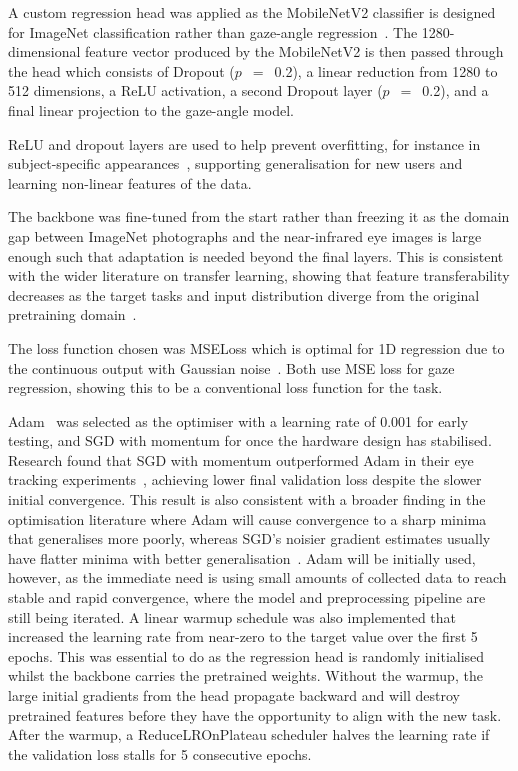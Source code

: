 A custom regression head was applied as the MobileNetV2 classifier is designed for ImageNet classification rather than gaze-angle regression~\cite{sandler2018mobilenetv2}. The 1280-dimensional feature vector produced by the MobileNetV2 is then passed through the head which consists of Dropout ($p$~$=$~0.2), a linear reduction from 1280 to 512 dimensions, a ReLU activation, a second Dropout layer ($p$~$=$~0.2), and a final linear projection to the gaze-angle model.

ReLU and dropout layers are used to help prevent overfitting, for instance in subject-specific appearances~\cite{srivastava2014dropout}, supporting generalisation for new users and learning non-linear features of the data.

The backbone was fine-tuned from the start rather than freezing it as the domain gap between ImageNet photographs and the near-infrared eye images is large enough such that adaptation is needed beyond the final layers. This is consistent with the wider literature on transfer learning, showing that feature transferability decreases as the target tasks and input distribution diverge from the original pretraining domain~\cite{yosinski2014transferable}.

The loss function chosen was MSELoss which is optimal for 1D regression due to the continuous output with Gaussian noise~\cite{zhang2015appearance, krafka2016eye}. Both use MSE loss for gaze regression, showing this to be a conventional loss function for the task.

Adam~\cite{kingma2015adam} was selected as the optimiser with a learning rate of 0.001 for early testing, and SGD with momentum for once the hardware design has stabilised. Research found that SGD with momentum outperformed Adam in their eye tracking experiments~\cite{chugh2020eye}, achieving lower final validation loss despite the slower initial convergence. This result is also consistent with a broader finding in the optimisation literature where Adam will cause convergence to a sharp minima that generalises more poorly, whereas SGD's noisier gradient estimates usually have flatter minima with better generalisation~\cite{keskar2017large, wilson2017marginal}. Adam will be initially used, however, as the immediate need is using small amounts of collected data to reach stable and rapid convergence, where the model and preprocessing pipeline are still being iterated. A linear warmup schedule was also implemented that increased the learning rate from near-zero to the target value over the first 5 epochs. This was essential to do as the regression head is randomly initialised whilst the backbone carries the pretrained weights. Without the warmup, the large initial gradients from the head propagate backward and will destroy pretrained features before they have the opportunity to align with the new task. After the warmup, a ReduceLROnPlateau scheduler halves the learning rate if the validation loss stalls for 5 consecutive epochs.

